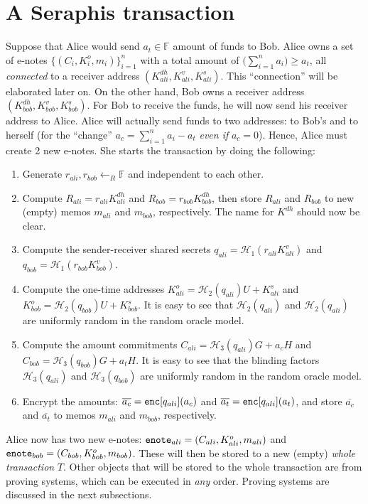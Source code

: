 \documentclass{article}
\begin{document}
\section{A Seraphis transaction}
Suppose that Alice would send $a_t\in\mathbb{F}$ amount of funds to Bob. Alice owns a set of e-notes $\{(C_i,K_i^o,m_i)\}_{i=1}^n$ with a total amount of $\big(\sum_{i=1}^{n}{a_i}\big)\ge a_t$, all \textit{connected} to a receiver address $(K_{ali}^{dh}, K_{ali}^v, K_{ali}^s)$. This ``connection'' will be elaborated later on. On the other hand, Bob owns a receiver address $(K_{bob}^{dh}, K_{bob}^v, K_{bob}^s)$. For Bob to receive the funds, he will now send his receiver address to Alice. Alice will actually send funds to two addresses: to Bob's and to herself (for the ``change'' $a_c = \sum_{i=1}^{n}{a_i} - a_t$ \textit{even if} $a_c=0$). Hence, Alice must create 2 new e-notes. She starts the transaction by doing the following:
\begin{enumerate}
    \item Generate $r_{ali}, r_{bob}\leftarrow_R\mathbb{F}$ and independent to each other.
    \item Compute $R_{ali} = r_{ali}K_{ali}^{dh}$ and $R_{bob} = r_{bob}K_{bob}^{dh}$, then store $R_{ali}$ and $R_{bob}$ to new (empty) memos $m_{ali}$ and $m_{bob}$, respectively. The name for $K^{dh}$ should now be clear.
    \item Compute the sender-receiver shared secrets $q_{ali} = \mathcal{H}_1(r_{ali}K_{ali}^{v})$ and $q_{bob} = \mathcal{H}_1(r_{bob}K_{bob}^{v})$.
    \item Compute the one-time addresses $K_{ali}^{o} = \mathcal{H}_2(q_{ali})U + K_{ali}^s$ and $K_{bob}^{o} = \mathcal{H}_2(q_{bob})U + K_{bob}^s$. It is easy to see that $\mathcal{H}_2(q_{ali})$ and $\mathcal{H}_2(q_{ali})$ are uniformly random in the random oracle model.
    \item Compute the amount commitments $C_{ali} = \mathcal{H}_3(q_{ali})G + a_c H$ and $C_{bob} = \mathcal{H}_3(q_{bob})G + a_t H$. It is easy to see that the blinding factors $\mathcal{H}_3(q_{ali})$ and $\mathcal{H}_3(q_{bob})$ are uniformly random in the random oracle model.
    \item Encrypt the amounts: $\overline{a_c} = {\tt enc}[q_{ali}](a_c)$ and $\overline{a_t} = {\tt enc}[q_{ali}](a_t)$, and store $\overline{a_c}$ and $\overline{a_t}$ to memos $m_{ali}$ and $m_{bob}$, respectively.
\end{enumerate}
Alice now has two new e-notes: ${\tt enote}_{ali} = (C_{ali}, K_{ali}^o, m_{ali})$ and ${\tt enote}_{bob} = (C_{bob}, K_{bob}^o, m_{bob})$. These will then be stored to a new (empty) \textit{whole transaction} $T$. Other objects that will be stored to the whole transaction are from proving systems, which can be executed in \textit{any} order. Proving systems are discussed in the next subsections.
\end{document}
